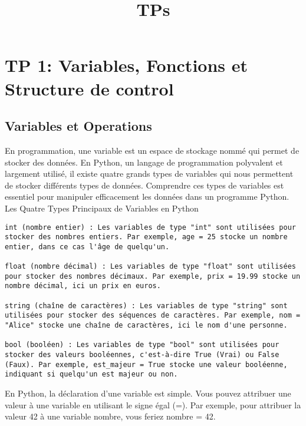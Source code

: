 \documentclass[11pt]{article}
\title{TPs}
\begin{document}
    
    \maketitle
    
    \tableofcontents

    
    \hypertarget{tp-1-variables-fonctions-et-structure-de-control}{%
\section{TP 1: Variables, Fonctions et Structure de
control}\label{tp-1-variables-fonctions-et-structure-de-control}}

\hypertarget{variables-et-operations}{%
\subsection{Variables et Operations}\label{variables-et-operations}}

    En programmation, une variable est un espace de stockage nommé qui
permet de stocker des données. En Python, un langage de programmation
polyvalent et largement utilisé, il existe quatre grands types de
variables qui nous permettent de stocker différents types de données.
Comprendre ces types de variables est essentiel pour manipuler
efficacement les données dans un programme Python. Les Quatre Types
Principaux de Variables en Python

\begin{verbatim}
int (nombre entier) : Les variables de type "int" sont utilisées pour stocker des nombres entiers. Par exemple, age = 25 stocke un nombre entier, dans ce cas l'âge de quelqu'un.

float (nombre décimal) : Les variables de type "float" sont utilisées pour stocker des nombres décimaux. Par exemple, prix = 19.99 stocke un nombre décimal, ici un prix en euros.

string (chaîne de caractères) : Les variables de type "string" sont utilisées pour stocker des séquences de caractères. Par exemple, nom = "Alice" stocke une chaîne de caractères, ici le nom d'une personne.

bool (booléen) : Les variables de type "bool" sont utilisées pour stocker des valeurs booléennes, c'est-à-dire True (Vrai) ou False (Faux). Par exemple, est_majeur = True stocke une valeur booléenne, indiquant si quelqu'un est majeur ou non.
\end{verbatim}

En Python, la déclaration d'une variable est simple. Vous pouvez
attribuer une valeur à une variable en utilisant le signe égal (=). Par
exemple, pour attribuer la valeur 42 à une variable nombre, vous feriez
nombre = 42.
\end{document}
